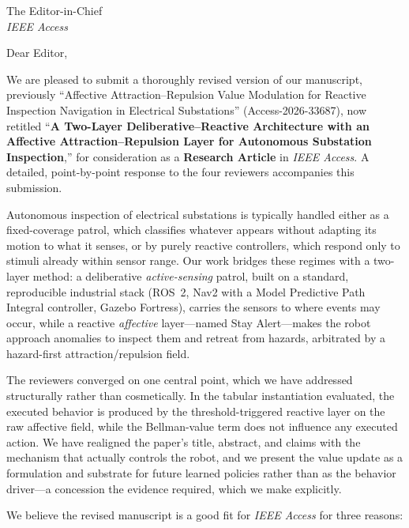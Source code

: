 \documentclass[11pt]{letter}
\begin{document}
\begin{letter}{The Editor-in-Chief\\\textit{IEEE Access}}

\opening{Dear Editor,}

We are pleased to submit a thoroughly revised version of our manuscript,
previously ``Affective Attraction--Repulsion Value Modulation for Reactive
Inspection Navigation in Electrical Substations'' (Access-2026-33687), now
retitled ``\textbf{A Two-Layer Deliberative--Reactive Architecture with an
Affective Attraction--Repulsion Layer for Autonomous Substation Inspection},''
for consideration as a \textbf{Research Article} in \textit{IEEE Access}. A
detailed, point-by-point response to the four reviewers accompanies this
submission.

Autonomous inspection of electrical substations is typically handled either as
a fixed-coverage patrol, which classifies whatever appears without adapting its
motion to what it senses, or by purely reactive controllers, which respond only
to stimuli already within sensor range. Our work bridges these regimes with a
two-layer method: a deliberative \emph{active-sensing} patrol, built on a
standard, reproducible industrial stack (ROS~2, Nav2 with a Model Predictive
Path Integral controller, Gazebo Fortress), carries the sensors to where events
may occur, while a reactive \emph{affective} layer---named Stay Alert---makes the
robot approach anomalies to inspect them and retreat from hazards, arbitrated by
a hazard-first attraction/repulsion field.

The reviewers converged on one central point, which we have addressed
structurally rather than cosmetically. In the tabular instantiation evaluated,
the executed behavior is produced by the threshold-triggered reactive layer on
the raw affective field, while the Bellman-value term does not influence any
executed action. We have realigned the paper's title, abstract, and claims with
the mechanism that actually controls the robot, and we present the value update
as a formulation and substrate for future learned policies rather than as the
behavior driver---a concession the evidence required, which we make explicitly.

We believe the revised manuscript is a good fit for \textit{IEEE Access} for
three reasons:


\end{letter}
\end{document}
